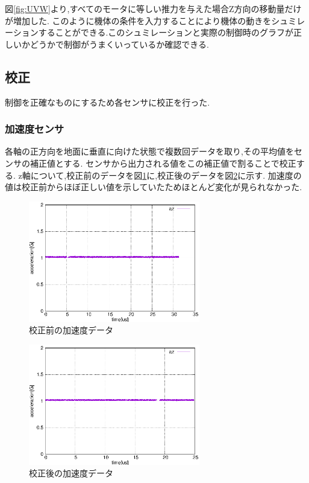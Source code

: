 \documentclass[12pt,oneside]{sotsuken_paper}
\begin{document}
図\ref{fig:UVW}より,すべてのモータに等しい推力を与えた場合Z方向の移動量だけが増加した.
このように機体の条件を入力することにより機体の動きをシュミレーションすることができる.このシュミレーションと実際の制御時のグラフが正しいかどうかで制御がうまくいっているか確認できる.

\subsection{校正}
制御を正確なものにするため各センサに校正を行った.

\subsubsection{加速度センサ}
各軸の正方向を地面に垂直に向けた状態で複数回データを取り,その平均値をセンサの補正値とする.
センサから出力される値をこの補正値で割ることで校正する.
z軸について,校正前のデータを図\ref{fig:acc-calib-be}に,校正後のデータを図\ref{fig:acc-calib-af}に示す.
加速度の値は校正前からほぼ正しい値を示していたためほとんど変化が見られなかった.

\begin{figure}[htbp]
	\begin{center}
		\includegraphics[width=75mm]{image/calibration/acc-calib-be.eps}
		\caption{校正前の加速度データ}
		\label{fig:acc-calib-be}
	\end{center}
\end{figure}

\begin{figure}[htbp]
	\begin{center}
		\includegraphics[width=75mm]{image/calibration/acc-calib-af.eps}
		\caption{校正後の加速度データ}
		\label{fig:acc-calib-af}
	\end{center}
\end{figure}
\end{document}
